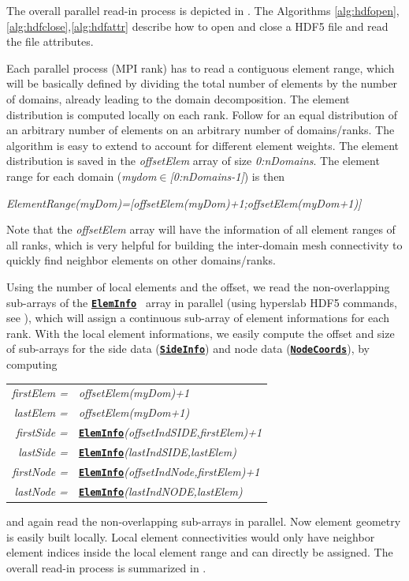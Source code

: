 \documentclass[a4paper,headsepline]{scrreprt}
\newcommand\rf[1]{\prettyref{#1}}
\newcommand\ttbf[1]{\textbf{\texttt{#1}}}
\newcommand\ElemInfo{\hyperlink{ElemInfo}{\ttbf{ElemInfo}}}
\newcommand\SideInfo{\hyperlink{SideInfo}{\ttbf{SideInfo}}}
\newcommand\NodeCoords{\hyperlink{NodeInfo}{\ttbf{NodeCoords}}}
\begin{document}
The overall parallel read-in process is depicted in \rf{fig:readin}. The Algorithms \ref{alg:hdfopen},\ref{alg:hdfclose},\ref{alg:hdfattr} describe how to open and close a HDF5 file and read the file attributes.

Each parallel process (MPI rank) has to read a contiguous element range, which will be basically defined by dividing the total number of elements by the number of domains, already leading to the domain decomposition. The element distribution is computed locally on each rank. Follow \rf{alg:dode} for an equal distribution of an arbitrary number of elements on an arbitrary number of domains/ranks. The algorithm is easy to extend to account for different element weights. The element distribution is saved in the \textit{offsetElem} array of size \emph{0:nDomains}.  The element range for each domain (\emph{mydom$\in$[0:nDomains-1]}) is then 

\textit{ElementRange(myDom)=[offsetElem(myDom)+1;offsetElem(myDom+1)]}

Note that the \textit{offsetElem} array will have the information of all element ranges of all ranks, which is very helpful for building the inter-domain mesh connectivity to quickly find neighbor elements on other domains/ranks.

Using the number of local elements and the offset, we read the non-overlapping sub-arrays of the \ElemInfo~ array in parallel (using hyperslab HDF5 commands, see \rf{alg:hdfarray}), which will assign a continuous sub-array of element informations for each rank. With the local element informations, we easily compute the offset and size of sub-arrays for the side data (\SideInfo) and node data (\NodeCoords), by computing

\begin{tabular}{rl}
\textit{firstElem =} & \textit{offsetElem(myDom)+1} \\
\textit{ lastElem =} & \textit{offsetElem(myDom+1)} \\[2ex]
\textit{firstSide =}&\ElemInfo\textit{(offsetIndSIDE,firstElem)+1 } \\ 
\textit{ lastSide =}& \ElemInfo\textit{(lastIndSIDE,lastElem) } \\[2ex]
\textit{firstNode =}& \ElemInfo\textit{(offsetIndNode,firstElem)+1 } \\ 
\textit{ lastNode =}& \ElemInfo\textit{(lastIndNODE,lastElem) } \\
\end{tabular}

and again read the non-overlapping sub-arrays in parallel. Now element geometry is easily built locally. Local element connectivities would only have neighbor element indices inside the local element range and can directly be assigned. The overall read-in process is summarized in \rf{alg:readmesh}.
\end{document}
